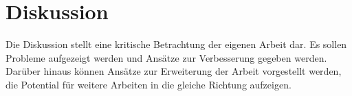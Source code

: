 \chapter{Diskussion}
\label{cpt:Diskussion}

Die Diskussion stellt eine kritische Betrachtung der eigenen Arbeit dar. Es sollen Probleme aufgezeigt werden und Ansätze zur Verbesserung gegeben werden. Darüber hinaus können Ansätze zur Erweiterung der Arbeit vorgestellt werden, die Potential für weitere Arbeiten in die gleiche Richtung aufzeigen. 